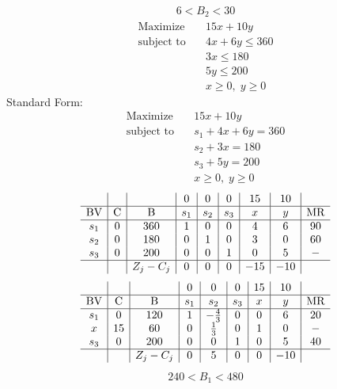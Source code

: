 \documentclass{article}
\begin{document}
\begin{align*}
6<B_{2}<30\end{align*}
\begin{align*}
\text{Maximize} \quad & 15x + 10y\\
\text{subject to} \quad
& 4x + 6y\le360\\
& 3x\le180\\
& 5y\le200\\
& x\ge0,\; y\ge0\end{align*}
Standard Form:\\
\begin{align*}
\text{Maximize} \quad & 15x + 10y\\
\text{subject to} \quad
& s_{1} + 4x + 6y=360\\
& s_{2} + 3x=180\\
& s_{3} + 5y=200\\
& x\ge0,\; y\ge0\end{align*}
\begin{align*}
\begin{array}{c|c|c|c|c|c|c|c|c}
 &  &  & 0 & 0 & 0 & 15 & 10 & \\
\hline
\text{BV} & \text{C} & \text{B} & s_{1} & s_{2} & s_{3} & x & y & \text{MR} \\
\hline
s_{1} & 0 & 360 & 1 & 0 & 0 & 4 & 6 & 90 \\
s_{2} & 0 & 180 & 0 & 1 & 0 & 3 & 0 & 60 \\
s_{3} & 0 & 200 & 0 & 0 & 1 & 0 & 5 & - \\
\hline
 &  & Z_j-C_j & 0 & 0 & 0 & -15 & -10 & \\
\end{array}
\end{align*}
\begin{align*}
\begin{array}{c|c|c|c|c|c|c|c|c}
 &  &  & 0 & 0 & 0 & 15 & 10 & \\
\hline
\text{BV} & \text{C} & \text{B} & s_{1} & s_{2} & s_{3} & x & y & \text{MR} \\
\hline
s_{1} & 0 & 120 & 1 & -\frac{4}{3} & 0 & 0 & 6 & 20 \\
x & 15 & 60 & 0 & \frac{1}{3} & 0 & 1 & 0 & - \\
s_{3} & 0 & 200 & 0 & 0 & 1 & 0 & 5 & 40 \\
\hline
 &  & Z_j-C_j & 0 & 5 & 0 & 0 & -10 & \\
\end{array}
\end{align*}
\begin{align*}
240<B_{1}<480\end{align*}
\end{document}
